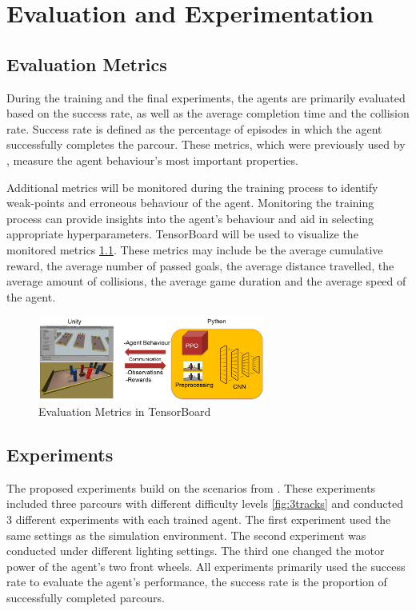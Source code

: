 \chapter{Evaluation and Experimentation}

\section{Evaluation Metrics}

During the training and the final experiments, the agents are primarily evaluated based on the success rate, as well as the average completion time and the collision rate. Success rate is defined as the percentage of episodes in which the agent successfully completes the parcour. These metrics, which were previously used by \autocite{maximilian}, measure the agent behaviour's most important properties.

Additional metrics will be monitored during the training process to identify weak-points and erroneous behaviour of the agent. Monitoring the training process can provide insights into the agent's behaviour and aid in selecting appropriate hyperparameters. TensorBoard will be used to visualize the monitored metrics \ref{fig:tensorboard}.
These metrics may include be the average cumulative reward, the average number of passed goals, the average distance travelled, the average amount of collisions, the average game duration and the average speed of the agent.

\begin{figure}
    \centering
    \includegraphics[width=0.666\textwidth]{Bilder/tensorboard2_test.png}
    \caption{Evaluation Metrics in TensorBoard}
    \label{fig:tensorboard}
\end{figure}


\section{Experiments}

The proposed experiments build on the scenarios from \autocite{maximilian}. These experiments included three parcours with different difficulty levels \ref{fig:3tracks} and conducted 3 different experiments with each trained agent. The first experiment used the same settings as the simulation environment. The second experiment was conducted under different lighting settings. The third one changed the motor power of the agent's two front wheels. All experiments primarily used the success rate to evaluate the agent's performance, the success rate is the proportion of successfully completed parcours.

